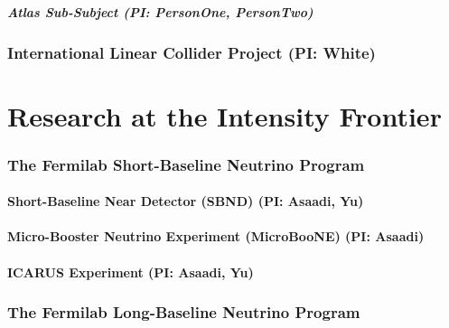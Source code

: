 \documentclass[11pt]{article}
\def\onehead#1{\part{#1}}
\def\twohead#1{\section{#1}}
\def\threehead#1{\subsection{#1}}
\def\fourhead#1{\subsubsection{#1}}
\begin{document}
\fourhead{Atlas Sub-Subject (PI: PersonOne, PersonTwo)}
%


\twohead{International Linear Collider Project (PI: White)}






\newpage


\onehead{Research at the Intensity Frontier}







\twohead{The Fermilab Short-Baseline Neutrino Program}


\threehead{Short-Baseline Near Detector (SBND) (PI: Asaadi, Yu)}


\threehead{Micro-Booster Neutrino Experiment (MicroBooNE) (PI: Asaadi)}



\threehead{ICARUS Experiment (PI: Asaadi, Yu)}


\twohead{The Fermilab Long-Baseline Neutrino Program}

\end{document}
